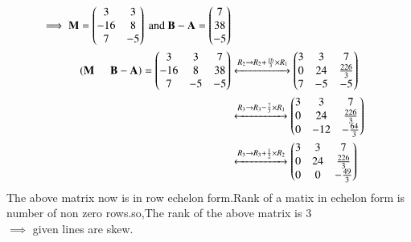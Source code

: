 \documentclass[journal]{IEEEtran}
\begin{document}
    \begin{align}
    \implies \mathbf{M}=\begin{pmatrix}
    3 & 3\\
    -16 & 8\\
    7 & -5
        \end{pmatrix} \text{ and }\mathbf{B-A}=\begin{pmatrix}7\\38\\-5\end{pmatrix}\\
         \left(\mathbf{M} \hspace{0.5cm} \mathbf{B-A}\right)=\begin{pmatrix}
            3 & 3 & 7\\
            -16 & 8 & 38\\
            7 & -5 & -5
        \end{pmatrix}&\xleftrightarrow{R_2 \rightarrow R_2+\frac{16}{3}\times R_1}
        \begin{pmatrix}
            3 & 3 & 7\\
            0 & 24 & \frac{226}{3}\\
            7 & -5 & -5
        \end{pmatrix}\\
        &\xleftrightarrow{R_3 \rightarrow R_3-\frac{7}{3}\times R_1}\begin{pmatrix}
            3 & 3 & 7\\
            0 & 24 & \frac{226}{3}\\
            0 & -12 & -\frac{64}{3}
        \end{pmatrix}\\
        &\xleftrightarrow{R_3 \rightarrow R_3+\frac{1}{2}\times R_2} \begin{pmatrix}
            3 & 3 & 7\\
            0 & 24 & \frac{226}{3}\\
            0 & 0 & -\frac{49}{3}
        \end{pmatrix}
\end{align}
The above matrix now is in row echelon form.Rank of a matix in echelon form is number of non zero rows.so,The rank of the above  matrix is 3\\
$\implies$ given lines are skew.
\end{document}
